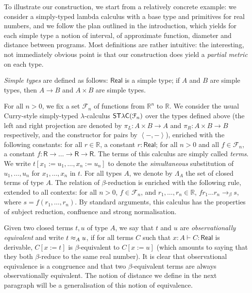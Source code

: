 
To illustrate our construction, we start from a relatively concrete example: we consider a simply-typed lambda calculus with a base type and primitives for real numbers, and we follow the plan outlined in the introduction, which yields for each simple type a notion of interval, of approximate function, diameter and distance between programs. Most definitions are rather intuitive: the interesting, not immediately obvious point is that our construction does yield a \emph{partial metric} on each type.

\emph{Simple types} are defined as follows: $\mathsf{Real}$ is a simple type; if $A$ and $B$ are simple types, then $A \to B$ and $A \times B$ are simple types.

For all $n>0$, we fix a set $\mathcal{F}_n$ of functions from $\mathbb{R}^n$ to $\mathbb{R}$. We consider the usual Curry-style simply-typed $\lambda$-calculus $\mathsf{ST\lambda C}(\mathcal F_{n})$ over the types defined above (the left and right projection are denoted by $\pi_L:A\times B \to A$ and  $\pi_R:A\times B \to B$ respectively, and the constructor for pairs by $\left\langle-,-\right\rangle$), enriched with the following constants: for all $r \in \mathbb{R}$, a constant $r:\mathsf{Real}$; for all $n>0$ and all $f\in\mathcal{F}_n$, a constant $f:\mathsf{R}\to\ldots\to\mathsf{R}\to\mathsf{R}$. The terms of this calculus are simply called \emph{terms}. We write $t[x_1 := u_1, \ldots, x_n := u_n]$ to denote the \emph{simultaneous} substitution of $u_1, \ldots, u_n$ for $x_1, \ldots, x_n$ in $t$. For all types $A$, we denote by $\Lambda_A$ the set of closed terms of type $A$. The relation of $\beta$-reduction is enriched with the following rule, extended to all contexts: for all $n>0$, $f\in\mathcal{F}_n$, and $r_1,\ldots,r_n\in\mathbb{R}$, $f r_1 \ldots r_n \to_\beta s$, where $s = f(r_1, \ldots, r_n)$. By standard arguments, this calculus has the properties of subject reduction, confluence and strong normalisation.


Given two closed terms $t,u$ of type $A$,  we say that $t$ and $u$ are \emph{observationally equivalent} and write $t \approx_A u$, if for all terms $C$ such that $x:A \vdash C : \mathsf{Real}$ is derivable, $C[x:=t]$ is $\beta$-equivalent to $C[x:=u]$ (which amounts to saying that they both $\beta$-reduce to the same real number).  It is clear that observational equivalence is a congruence and that two $\beta$-equivalent terms are always observationally equivalent. The notion of distance we define in the next paragraph will be a generalisation of this notion of equivalence.




